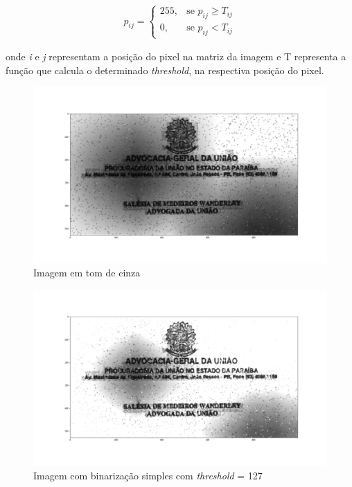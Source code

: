 \begin{gather}
  p_{ij} =
  \begin{cases}
    255, & \text{se } p_{ij}\geq T_{ij} \\
    0, & \text{se } p_{ij} < T_{ij}
  \end{cases}
  \label{math:adaptative-threshold}
\end{gather}

onde \textit{i} e \textit{j} representam a posição do pixel na matriz da imagem e T representa a função que calcula o determinado \textit{threshold}, na respectiva posição do pixel.

\begin{figure}[h]
  \centering
  \caption{Imagem em tom de cinza}
  \includegraphics[scale=0.25]{figuras/binarization-original.jpg}
\end{figure}

\begin{figure}[h]
  \centering
  \caption{Imagem com binarização simples com \textit{threshold} = 127}
  \includegraphics[scale=0.25]{figuras/binarization-threshold.jpg}
\end{figure}

